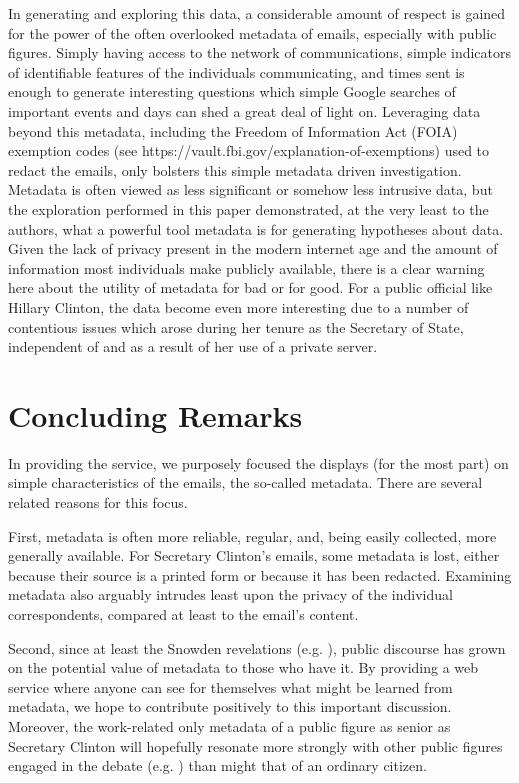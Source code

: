 \documentclass[journal]{vgtc}                %
\begin{document}
In generating and exploring this data, a considerable amount of respect is gained for the power of the often overlooked metadata of emails, especially with public figures. Simply having access to the network of communications, simple indicators of identifiable features of the individuals communicating, and times sent is enough to generate interesting questions which simple Google searches of important events and days can shed a great deal of light on. Leveraging data beyond this metadata, including the Freedom of Information Act (FOIA) exemption codes (see https://vault.fbi.gov/explanation-of-exemptions) used to redact the emails, only bolsters this simple metadata driven investigation. Metadata is often viewed as less significant or somehow less intrusive data, but the exploration performed in this paper demonstrated, at the very least to the authors, what a powerful tool metadata is for generating hypotheses about data. Given the lack of privacy present in the modern internet age and the amount of information most individuals make publicly available, there is a clear warning here about the utility of metadata for bad or for good. For a public official like Hillary Clinton, the data become even more interesting due to a number of contentious issues which arose during her tenure as the Secretary of State, independent of and as a result of her use of a private server.
\section{Concluding Remarks}
In providing the service, we purposely focused the displays (for the most part) on simple characteristics of the emails, the so-called metadata.  There are several related reasons for this focus.  

First, metadata is often more reliable, regular, and, being easily collected, more generally available.  For Secretary Clinton's emails,  some metadata is lost, either because their source is a printed form or because it has been redacted.  Examining metadata also arguably intrudes least upon the privacy of the individual correspondents, compared at least to the email's content.  

Second, since at least the Snowden revelations (e.g. \cite{NYRsnowdenLeaks}), public discourse has grown on the potential value of metadata to those who have it.  By providing a web service where anyone can see for themselves what might be learned from metadata, we hope to contribute positively to this important discussion.  Moreover, the work-related only metadata of a public figure as senior as Secretary Clinton will hopefully resonate more strongly with other public figures  engaged in the debate (e.g.   \cite{NYRmetadata, ObamaMetadata, JebBushMetadata2015, PompeoMetadata, TrumpMetadata}) than might that of an ordinary citizen.  
\end{document}
